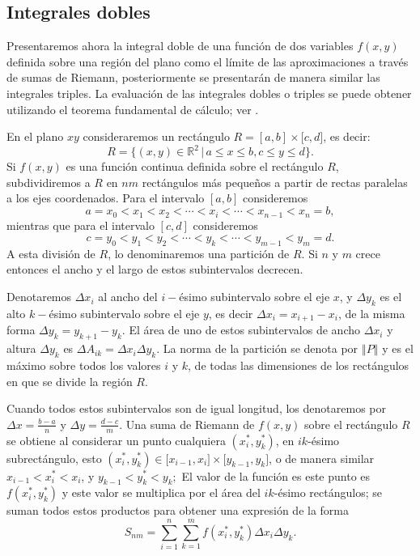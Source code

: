 \subsection{Integrales dobles} \label{integralesdobles}  
Presentaremos ahora la integral doble de una función de
dos variables $f(x,y)$ definida sobre una región del plano como el
límite de las aproximaciones a través de sumas de Riemann, posteriormente
se presentarán de manera similar las integrales triples.
La evaluación de las integrales dobles o triples se puede obtener
utilizando el teorema fundamental de cálculo; ver \cite{apostol_calculus_1999}.

En el plano $xy$ consideraremos un rectángulo $R=[a,b]\times \lbrack c,d]$, es decir:
\[R=\{(x,y) \in \mathbb{R}^{2}\, | \,a\leq x\leq b,c\leq y\leq d\}.\]
Si $f(x,y)$ es una función continua definida sobre el rectángulo $R$,
subdividiremos a $R$ en $nm$ rectángulos más pequeños a partir
de rectas paralelas a los ejes coordenados. Para el intervalo $[a,b]$ consideremos
\[a=x_{0}<x_{1}<x_{2}<\cdots <x_{i}<\cdots <x_{n-1}<x_{n}=b,\] mientras que
para el intervalo $[c,d]$ consideremos
\[c=y_{0}<y_{1}<y_{2}<\cdots <y_{k}<\cdots <y_{m-1}<y_{m}=d.\] A esta división de $R$, lo denominaremos una partición de $R$.
Si $n$ y $m$ crece entonces el ancho y el largo de estos subintervalos decrecen.

Denotaremos $\Delta x_{i}$ al ancho del $i-$ésimo subintervalo
sobre el eje $x$, y $\Delta y_{k}$ es el alto $k-$ésimo subintervalo sobre el eje $y$,
es decir $\Delta x_{i}=x_{i+1}-x_{i}$, de la misma forma $\Delta
y_{k}=y_{k+1}-y_{k}$. El área de uno de estos subintervalos de ancho $\Delta x_{i}$ y altura $\Delta y_{k}$ es
$\Delta A_{ik}=\Delta x_{i}\Delta y_{k}$.
La norma de la partición se denota por $\left\Vert P\right\Vert$ y es el máximo sobre todos los valores
$i$ y $k$, de todas las dimensiones de los rectángulos en que se divide la región $R$.

Cuando todos estos subintervalos son de igual longitud, los denotaremos por $\Delta x=\frac{b-a}{n}$ y $\Delta y=\frac{d-c}{m}$.
Una suma de Riemann de $f(x,y) $ sobre el rectángulo $R$ se obtiene al considerar un punto cualquiera
$\left( x_{i}^{\ast },y_{k}^{\ast}\right) $, en $ik$-ésimo subrectángulo, esto
$\left( x_{i}^{\ast},y_{k}^{\ast }\right) \in \lbrack x_{i-1},x_{i}]\times \lbrack y_{k-1},y_{k}]$,
o de manera similar $x_{i-1}<x_{i}^{\ast }<x_{i}$, y $y_{k-1}<y_{k}^{\ast }<y_{k};$
El valor de la función es este punto es $f\left( x_{i}^{\ast},y_{k}^{\ast }\right) $ y este valor se
multiplica por el área del $ik$-ésimo rectángulos; se suman todos estos productos para obtener una
expresión de la forma
\[S_{nm}=\sum_{i=1}^{n}\sum_{k=1}^{m}f\left( x_{i}^{\ast },y_{k}^{\ast}\right) \Delta x_{i}\Delta y_{k}.\]

